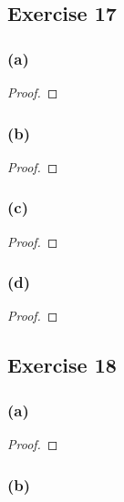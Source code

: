 \documentclass[14pt]{extarticle}
\begin{document}
\subsection{Exercise 17}

\subsubsection{(a)}

\begin{proof}

\end{proof}

\subsubsection{(b)}

\begin{proof}

\end{proof}

\subsubsection{(c)}

\begin{proof}

\end{proof}

\subsubsection{(d)}

\begin{proof}

\end{proof}

\subsection{Exercise 18}

\subsubsection{(a)}

\begin{proof}

\end{proof}

\subsubsection{(b)}
\end{document}
